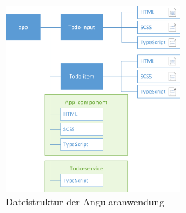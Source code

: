 \begin{figure}[H]
	\includegraphics[width=0.6\textwidth]{img/pwa_dateistruktur.png}
	\centering
	\caption{Dateistruktur der Angularanwendung}
	\label{fig:pwa_dateistruktur}
\end{figure}

